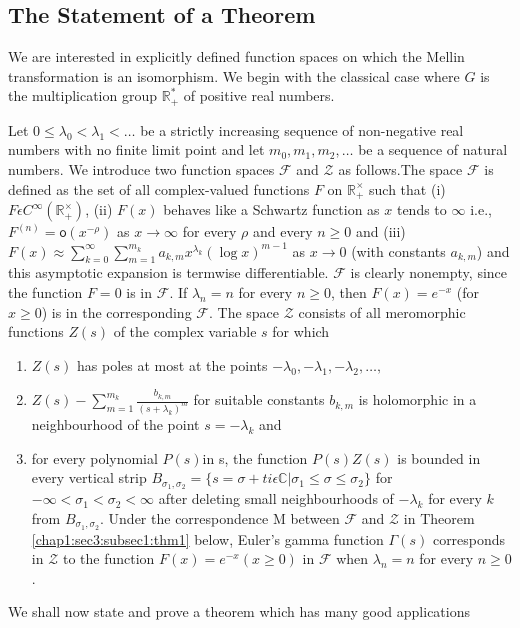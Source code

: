 \subsection{The Statement of a Theorem}\label{chap1:sec3:subsec1}

We are interested in explicitly defined function spaces on which the
Mellin transformation is an isomorphism. We begin with the classical
case where $G$ is the multiplication group $\mathbb{R}_{+}^{*}$ of
positive real numbers.

 Let $0\le\lambda_{0}<\lambda_{1}<\ldots$ be a strictly increasing
 sequence of non-negative real numbers with no finite limit point and
 let $m_0,m_1,m_2,\dots$ be a sequence of natural numbers. We
 introduce two function spaces $\mathcal{F}$ and $\mathcal{Z}$ as
 follows.The space $\mathcal{F}$ is defined as the set of all
 complex-valued functions $F$ on $\mathbb{R}_{+}^\times$ such that (i)
 $F\epsilon C^\infty(\mathbb{R}_{+}^\times)$, (ii) $F(x)$ behaves like a
 Schwartz function as $x$ tends to $\infty$ i.e.,
 $F^{(n)}=\mathsf{o}(x^{-\rho})$ as $x\rightarrow \infty$ for every $\rho$
 and every $n\ge 0$ and
 (iii)$F(x)\approx\sum\limits_{k=0}^{\infty}\sum\limits_{m=1}^{m_{k}}
 a_{k,m}x^{\lambda_{k}}{(\log x)}^{m-1}$ as $x\rightarrow 0$ (with
   constants $a_{k,m}$) and this asymptotic expansion is termwise
   differentiable. $\mathcal{F}$ is clearly nonempty, since the
   function $F=0$ is in $\mathcal{F}$. If $\lambda_n=n$ for every $n\ge0$,
   then $F(x)=e^{-x}$ (for $x\ge0$) is in the corresponding
   $\mathcal{F}$. The space $\mathcal{Z}$ consists of all meromorphic
   functions $Z(s)$ of the complex variable $s$ for which
\begin{enumerate}
\item $Z(s)$ has poles at most at the points
  $-\lambda_0,-\lambda_1,-\lambda_2,\dots,$
\item
  $Z(s)-\sum\limits_{m=1}^{m_{k}}\frac{b_{k,m}}{(s+\lambda_{k})^{m}}$\pageoriginale
  for suitable constants $b_{k,m}$ is holomorphic in a neighbourhood
  of the point $s=-\lambda_{k}$ and 
\item for every polynomial $P(s)$in s, the function $P(s)Z(s)$ is
  bounded in every vertical strip $B_{\sigma_{1},\sigma_{2}}=\{s=\sigma
    + ti \epsilon\mathbb{C}\vert\sigma_{1}\le\sigma\le\sigma_{2}\}$ for
  $-\infty<\sigma_{1}<\sigma_{2}<\infty$ after deleting small
  neighbourhoods of $-\lambda_{k}$ for every $k$ from
  $B_{\sigma_{1},\sigma_{2}}$. Under the correspondence M between
  $\mathcal{F}$ and $\mathcal{Z}$ in Theorem \ref{chap1:sec3:subsec1:thm1} below, Euler's
  gamma function $\Gamma(s)$ corresponds in $\mathcal{Z}$ to the
  function $F(x)=e^{-x}(x\ge 0)$ in $\mathcal{F}$ when $\lambda_{n}=n$
  for every $n\ge 0$.
\end{enumerate}
We shall now state and prove a theorem which has many good
applications 

